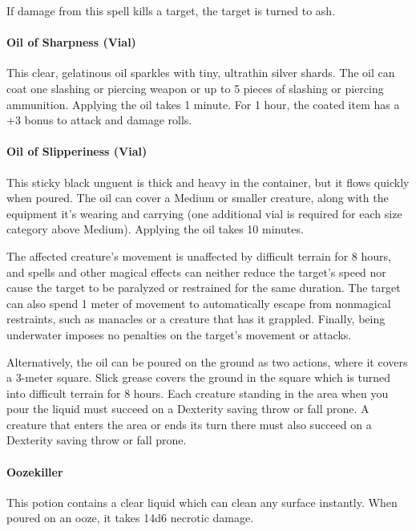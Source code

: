         If damage from this spell kills a target, the target is turned to ash.
    \paragraph{Oil of Sharpness (Vial)}
        This clear, gelatinous oil sparkles with tiny, ultrathin silver shards.
        The oil can coat one slashing or piercing weapon or up to 5 pieces of slashing or piercing ammunition.
        Applying the oil takes 1 minute.
        For 1 hour, the coated item has a +3 bonus to attack and damage rolls.
    \paragraph{Oil of Slipperiness (Vial)} \label{item::oilofslipperiness} %
        This sticky black unguent is thick and heavy in the container, but it flows quickly when poured.
        The oil can cover a Medium or smaller creature, along with the equipment it's wearing and carrying (one additional vial is required for each size category above Medium).
        Applying the oil takes 10 minutes.

        The affected creature's movement is unaffected by difficult terrain for 8 hours, and spells and other magical effects can neither reduce the target's speed nor cause the target to be paralyzed or restrained for the same duration.
        The target can also spend 1 meter of movement to automatically escape from nonmagical restraints, such as manacles or a creature that has it grappled.
        Finally, being underwater imposes no penalties on the target's movement or attacks.

        Alternatively, the oil can be poured on the ground as two actions, where it covers a 3-meter square.
        Slick grease covers the ground in the square which is turned into difficult terrain for 8 hours.
        Each creature standing in the area when you pour the liquid must succeed on a Dexterity saving throw or fall prone.
        A creature that enters the area or ends its turn there must also succeed on a Dexterity saving throw or fall prone.
    \paragraph{Oozekiller} \label{item::oozekiller}
        This potion contains a clear liquid which can clean any surface instantly.
        When poured on an ooze, it takes 14d6 necrotic damage.


